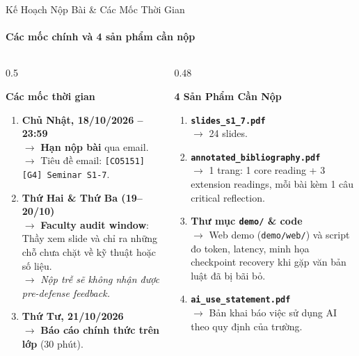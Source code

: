 \documentclass[aspectratio=1610,10pt,xcolor={table}]{beamer}
\begin{document}
\begin{frame}{Kế Hoạch Nộp Bài \& Các Mốc Thời Gian}
  \framesubtitle{Các mốc chính và 4 sản phẩm cần nộp}

  \begin{columns}[t]
    \begin{column}{0.5\textwidth}
      \begin{block}{\textbf{Các mốc thời gian}}
        \footnotesize
        \begin{enumerate}
          \item \textbf{Chủ Nhật, 18/10/2026 -- 23:59}\\
                $\to$ \textbf{Hạn nộp bài} qua email.\\
                $\to$ Tiêu đề email: \texttt{[CO5151][G4] Seminar S1-7}.
          \item \textbf{Thứ Hai \& Thứ Ba (19--20/10)}\\
                $\to$ \textbf{Faculty audit window}: Thầy xem slide và chỉ ra những chỗ chưa chặt về kỹ thuật hoặc số liệu.\\
                $\to$ \textit{Nộp trễ sẽ không nhận được pre-defense feedback.}
          \item \textbf{Thứ Tư, 21/10/2026}\\
                $\to$ \textbf{Báo cáo chính thức trên lớp} (30 phút).
        \end{enumerate}
      \end{block}
    \end{column}

    \begin{column}{0.48\textwidth}
      \begin{alertblock}{\textbf{4 Sản Phẩm Cần Nộp}}
        \footnotesize
        \begin{enumerate}
          \item \textbf{\texttt{slides\_s1\_7.pdf}}\\
                $\to$ 24 slides.
          \item \textbf{\texttt{annotated\_bibliography.pdf}}\\
                $\to$ 1 trang: 1 core reading + 3 extension readings, mỗi bài kèm 1 câu critical reflection.
          \item \textbf{Thư mục \texttt{demo/} \& code}\\
                $\to$ Web demo (\texttt{demo/web/}) và script đo token, latency, minh họa checkpoint recovery khi gặp văn bản luật đã bị bãi bỏ.
          \item \textbf{\texttt{ai\_use\_statement.pdf}}\\
                $\to$ Bản khai báo việc sử dụng AI theo quy định của trường.
        \end{enumerate}
      \end{alertblock}
    \end{column}
  \end{columns}
\end{frame}
\end{document}
